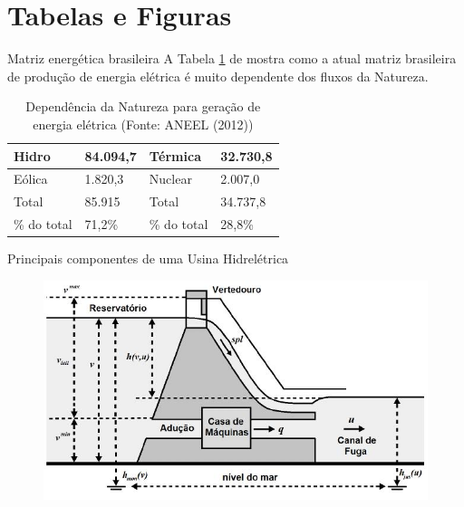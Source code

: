 \documentclass{beamer}
\begin{document}
  \section{Tabelas e Figuras}
  
  \begin{frame}{Matriz energética brasileira}
    A Tabela \ref{table:dependenciaNatureza2012} de \cite{junior1998} mostra como a atual matriz brasileira de produção de energia elétrica é muito dependente dos fluxos da Natureza.
    
    \begin{table}
    \caption{Dependência da Natureza para geração de energia elétrica (Fonte: ANEEL (2012))}
    \label{table:dependenciaNatureza2012}
    \begin{tabular}{|l|l|l|l|}
	\hline
	Hidro       & 84.094,7   & Térmica      & 32.730,8  \\ \hline
	Eólica      & 1.820,3    & Nuclear      & 2.007,0    \\ \hline
	Total       & 85.915     & Total        & 34.737,8  \\ \hline
	\% do total & 71,2\%     & \% do total  & 28,8\%    \\ \hline
    \end{tabular}
    \end{table}
  \end{frame}
  
  \begin{frame}{Principais componentes de uma Usina Hidrelétrica}
    
    \begin{figure}
      \centering
      \includegraphics[width=\textwidth]{./fig/Componentes-usinas-hidreletricas.jpg}
      \label{fig:componentesUsinasHidreletricas}
    \end{figure}
  \end{frame}
  
\end{document}
